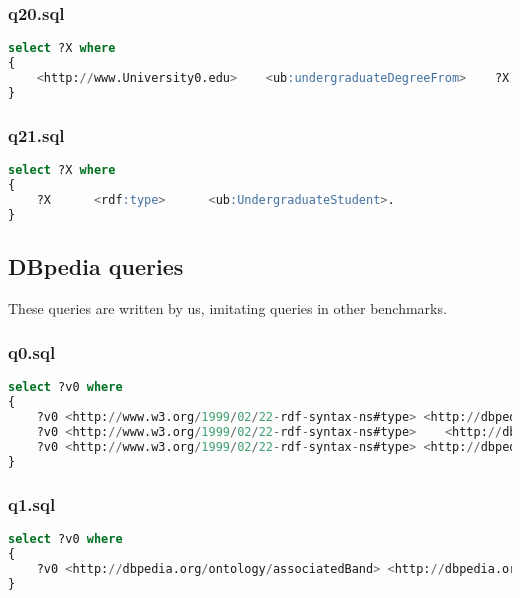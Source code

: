 \documentclass[titlepage, a4paper, 12pt] {article}
\begin{document}
\subsubsection{q20.sql}

\begin{lstlisting}[language=SQL]
select ?X where
{
	<http://www.University0.edu>    <ub:undergraduateDegreeFrom>    ?X.
}
\end{lstlisting}

\subsubsection{q21.sql}

\begin{lstlisting}[language=SQL]
select ?X where
{
	?X      <rdf:type>      <ub:UndergraduateStudent>.
}
\end{lstlisting}



\subsection{DBpedia queries}\label{dbpedia}

These queries are written by us, imitating queries in other benchmarks.

\subsubsection{q0.sql}

\begin{lstlisting}[language=SQL] 
select ?v0 where
{
	?v0 <http://www.w3.org/1999/02/22-rdf-syntax-ns#type> <http://dbpedia.org/class/yago/LanguagesOfBotswana> .
	?v0 <http://www.w3.org/1999/02/22-rdf-syntax-ns#type>    <http://dbpedia.org/class/yago/LanguagesOfNamibia> .
	?v0 <http://www.w3.org/1999/02/22-rdf-syntax-ns#type> <http://dbpedia.org/ontology/Language> .
}
\end{lstlisting}

\subsubsection{q1.sql}

\begin{lstlisting}[language=SQL] 
select ?v0 where
{
	?v0 <http://dbpedia.org/ontology/associatedBand> <http://dbpedia.org/resource/LCD_Soundsystem> .
}
\end{lstlisting}
\end{document}
